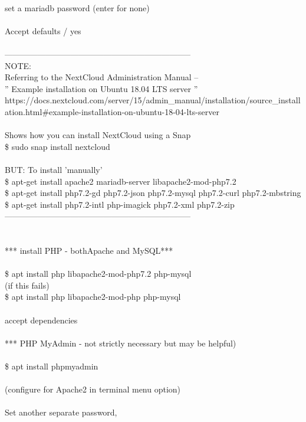 \documentclass[10pt,a4paper]{article}
\begin{document}
{\\
	set a mariadb password (enter for none)\\
\\
	Accept defaults / yes\\
	\\
	--------------------------------------------------------------------\\
	NOTE:\\
	Referring to the NextCloud Administration Manual --\\
		'' Example installation on Ubuntu 18.04 LTS server ''\\
	https://docs.nextcloud.com/server/15/admin\_manual/installation/source\_installation.html\#example-installation-on-ubuntu-18-04-lts-server}{\large \\
\\
	Shows how you can install NextCloud using a Snap\\
	\$ sudo snap install nextcloud\\
\\
	BUT: To install 'manually'\\
	\$ apt-get install apache2 mariadb-server libapache2-mod-php7.2\\
	\$ apt-get install php7.2-gd php7.2-json php7.2-mysql php7.2-curl php7.2-mbstring\\
	\$ apt-get install php7.2-intl php-imagick php7.2-xml php7.2-zip\\
	--------------------------------------------------------------------\\
\\
\\
*** install PHP  - bothApache and MySQL***\\
\\
	\$ apt install php libapache2-mod-php7.2 php-mysql\\
(if this fails)\\
	\$ apt install php libapache2-mod-php php-mysql\\
	\\
	accept dependencies\\
\\
*** PHP MyAdmin - not strictly necessary but may be helpful)\\
\\
	\$ apt install phpmyadmin\\
\\
	(configure for Apache2 in terminal menu option)\\
\\
	Set another separate password, \\
}
\end{document}
